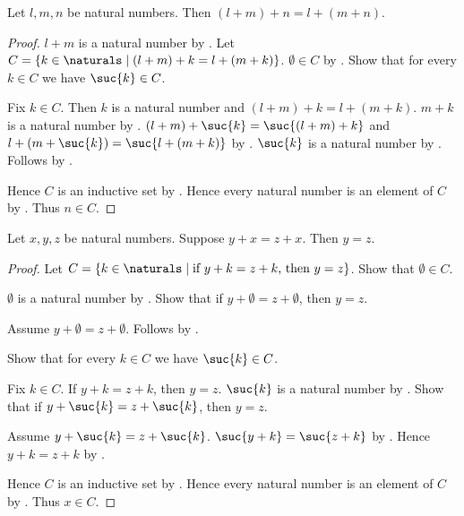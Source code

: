 \begin{theorem}\label{natural_addition_associative}
    Let $l,m,n$ be natural numbers.
    Then $(l+m)+n=l+(m+n)$.
\end{theorem}
\begin{proof}
    $l+m$ is a natural number by .
    Let $C=\{k\in\naturals\mid
        \text{$(l+m)+k=l+(m+k)$}\}$.
    $\emptyset\in C$
        by .
    Show that for every $k\in C$ we have $\suc{k}\in C$.
    \begin{subproof}
        Fix $k\in C$.
        Then $k$ is a natural number and
            $(l+m)+k=l+(m+k)$.
        $m+k$ is a natural number by .
        $(l+m)+\suc{k}=\suc{(l+m)+k}$ and
            $l+(m+\suc{k})=\suc{l+(m+k)}$
            by .
        $\suc{k}$ is a natural number by .
        Follows by .
    \end{subproof}
    Hence $C$ is an inductive set by .
    Hence every natural number is an element of $C$
        by .
    Thus $n\in C$.
\end{proof}

\begin{theorem}\label{natural_addition_cancel_right}
    Let $x,y,z$ be natural numbers.
    Suppose $y+x=z+x$.
    Then $y=z$.
\end{theorem}
\begin{proof}
    Let $C=\{k\in\naturals\mid
        \text{if $y+k=z+k$, then $y=z$}\}$.
    Show that $\emptyset\in C$.
    \begin{subproof}
        $\emptyset$ is a natural number by .
        Show that if $y+\emptyset=z+\emptyset$, then $y=z$.
        \begin{subproof}
            Assume $y+\emptyset=z+\emptyset$.
            Follows by .
        \end{subproof}
    \end{subproof}
    Show that for every $k\in C$ we have $\suc{k}\in C$.
    \begin{subproof}
        Fix $k\in C$.
        If $y+k=z+k$, then $y=z$.
        $\suc{k}$ is a natural number by .
        Show that if $y+\suc{k}=z+\suc{k}$, then $y=z$.
        \begin{subproof}
            Assume $y+\suc{k}=z+\suc{k}$.
            $\suc{y+k}=\suc{z+k}$
                by .
            Hence $y+k=z+k$ by .
        \end{subproof}
    \end{subproof}
    Hence $C$ is an inductive set by .
    Hence every natural number is an element of $C$
        by .
    Thus $x\in C$.
\end{proof}

